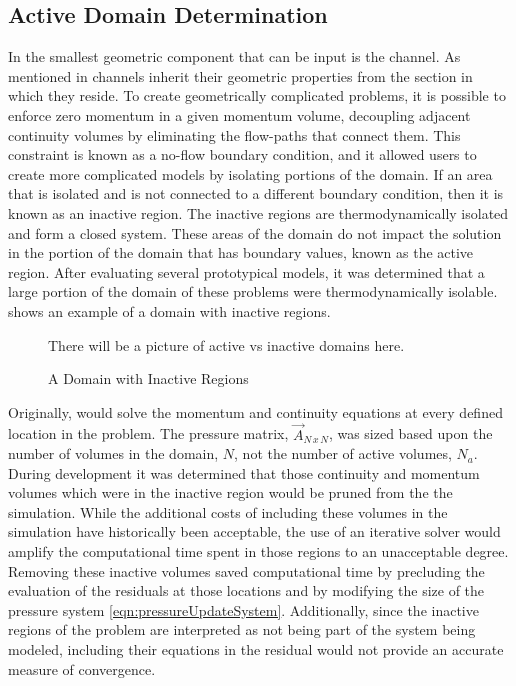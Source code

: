 \subsection{Active Domain Determination}
\label{subsect:activeDomainDetermination}
In \cobra{} the smallest geometric component that can be input is the channel.
As mentioned in  channels inherit their geometric properties from the section in which they reside.
To create geometrically complicated problems, it is possible to enforce zero momentum in a given momentum volume, decoupling adjacent continuity volumes by eliminating the flow-paths that connect them.
This constraint is known as a no-flow boundary condition, and it allowed users to create more complicated models by isolating portions of the domain.
If an area that is isolated and is not connected to a different boundary condition, then it is known as an inactive region.
The inactive regions are thermodynamically isolated and form a closed system.
These areas of the domain do not impact the solution in the portion of the domain that has boundary values, known as the active region.
After evaluating several prototypical models, it was determined that a large portion of the domain of these problems were thermodynamically isolable.
 shows an example of a domain with inactive regions.

\begin{figure}[h!t]
\centering
There will be a picture of active vs inactive domains here.
\caption{A Domain with Inactive Regions}
\label{fig:activeDomain}
\end{figure}

Originally, \cobra{} would solve the momentum and continuity equations at every defined location in the problem.
The pressure matrix, $\vec{A}_{N\,x\,N}$, was sized based upon the number of volumes in the domain, $N$, not the number of active volumes, $N_{a}$.
During development it was determined that those continuity and momentum volumes which were in the inactive region would be pruned from the the simulation.
While the additional costs of including these volumes in the simulation have historically been acceptable, the use of an iterative solver would amplify the computational time spent in those regions to an unacceptable degree.
Removing these inactive volumes saved computational time by precluding the evaluation of the residuals at those locations and by modifying the size of the pressure system \eqref{eqn:pressureUpdateSystem}.
Additionally, since the inactive regions of the problem are interpreted as not being part of the system being modeled, including their equations in the residual would not provide an accurate measure of convergence.


